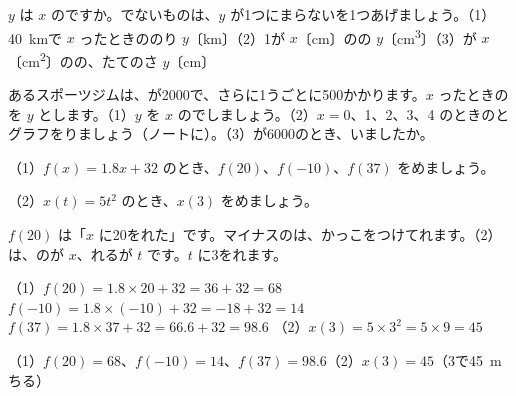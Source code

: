 \begingroup{}%
\noindent\begin{minipage}[t]{0.49\linewidth}
\begin{jibun}
$y$ は $x$ のですか。でないものは、$y$ が1つにまらないを1つあげましょう。（1）\qty{40}{km}で $x$ ったときののり $y$〔km〕（2）1が $x$〔cm〕のの $y$〔\unit{cm^3}〕（3）が $x$〔\unit{cm^2}〕のの、たてのさ $y$〔cm〕
\end{jibun}
\end{minipage}\hfill
\begin{minipage}[t]{0.49\linewidth}
\begin{jibun}
あるスポーツジムは、が2000で、さらに1うごとに500かかります。$x$ ったときのを $y$ とします。（1）$y$ を $x$ のでしましょう。（2）$x=0$、1、2、3、4 のときのとグラフをりましょう（ノートに）。（3）が6000のとき、いましたか。
\end{jibun}
\end{minipage}\par
\endgroup

\begin{reidai}[$f(x)$ の\R{値}{あたい}を\R{求}{もと}める]
（1）$f(x)=1.8x+32$ のとき、$f(20)$、$f(-10)$、$f(37)$ をめましょう。\par
（2）$x(t)=5t^2$ のとき、$x(3)$ をめましょう。\par
\kangaekata $f(20)$ は「$x$ に20をれた」です。マイナスのは、かっこをつけてれます。（2）は、のが $x$、れるが $t$ です。$t$ に3をれます。\par
\bkthrdSi（1）\nobreak $f(20)=1.8\times20+32=36+32=68$
\bkthrdJ $f(-10)=1.8\times(-10)+32=-18+32=14$
\bkthrdJ $f(37)=1.8\times37+32=66.6+32=98.6$
\bkthrdI（2）\nobreak $x(3)=5\times3^2=5\times9=45$\par
\bkthrdK（1）\nobreak $f(20)=68$、$f(-10)=14$、$f(37)=98.6$\quad（2）\nobreak $x(3)=45$（3で\qty{45}{m}ちる）
\end{reidai}


